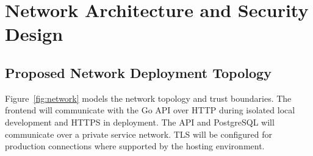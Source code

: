 \documentclass[11pt,a4paper]{report}
\begin{document}

\chapter{Network Architecture and Security Design}

\section{Proposed Network Deployment Topology}
Figure~\ref{fig:network} models the network topology and trust boundaries. The frontend will communicate with the Go API over HTTP during isolated local development and HTTPS in deployment. The API and PostgreSQL will communicate over a private service network. TLS will be configured for production connections where supported by the hosting environment.
\end{document}
